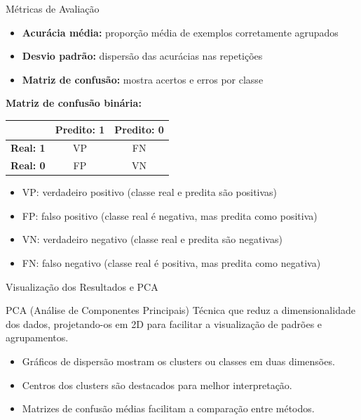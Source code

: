 \documentclass[aspectratio=169]{beamer}
\begin{document}
\begin{frame}{Métricas de Avaliação}
\begin{itemize}
    \item \textbf{Acurácia média:} proporção média de exemplos corretamente agrupados
    \item \textbf{Desvio padrão:} dispersão das acurácias nas repetições
    \item \textbf{Matriz de confusão:} mostra acertos e erros por classe
\end{itemize}
\vspace{0.5em}
\textbf{Matriz de confusão binária:}
\begin{center}
\begin{tabular}{|c|c|c|}
    \hline
    & \textbf{Predito: 1} & \textbf{Predito: 0} \\
    \hline
    \textbf{Real: 1} & VP & FN \\
    \hline
    \textbf{Real: 0} & FP & VN \\
    \hline
\end{tabular}
\end{center}
\begin{itemize}
    \item VP: verdadeiro positivo (classe real e predita são positivas)
    \item FP: falso positivo (classe real é negativa, mas predita como positiva)
    \item VN: verdadeiro negativo (classe real e predita são negativas)
    \item FN: falso negativo (classe real é positiva, mas predita como negativa)
\end{itemize}
\end{frame}

\begin{frame}{Visualização dos Resultados e PCA}
\begin{block}{PCA (Análise de Componentes Principais)}
Técnica que reduz a dimensionalidade dos dados, projetando-os em 2D para facilitar a visualização de padrões e agrupamentos.
\end{block}

\begin{itemize}
    \item Gráficos de dispersão mostram os clusters ou classes em duas dimensões.
    \item Centros dos clusters são destacados para melhor interpretação.
    \item Matrizes de confusão médias facilitam a comparação entre métodos.
\end{itemize}
\end{frame}
\end{document}

